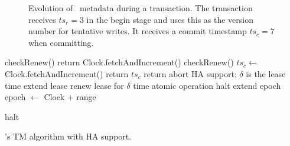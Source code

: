 \begin{figure}[!t]
  
  \caption{\small Evolution of \sysll\ metadata during a transaction. The transaction receives $ts_r=3$ in the begin stage 
  and uses this as the version number for tentative writes. It receives a commit timestamp $ts_c=7$ when committing.}
  \label{fig:model}
\end{figure}



\begin{algorithm}[htb]
\begin{algorithmic}[1]
\small
{}
\State checkRenew()
\State return Clock.fetchAndIncrement()
\EndProcedure
{}
\State checkRenew()
\State $ts_c \leftarrow$ Clock.fetchAndIncrement()
 \State return $ts_c$
 \Else
 \State return {\sc abort}
\EndIf
\EndProcedure
%
 \Comment HA support;  $\delta$ is the lease time
 \label{l:lease-start} \Comment extend lease
 \State renew lease for $\delta$ time \Comment atomic operation
  halt \EndIf 
\EndIf  \label{l:lease-end}
  \label{l:epoch-start} \Comment extend epoch
\State epoch $\leftarrow$ Clock +  range
 
 halt \EndIf 
\EndIf  \label{l:epoch-end}
\EndProcedure

\end{algorithmic}
\caption{\sysll's TM algorithm with HA support.}
\label{alg:ha}
\end{algorithm}

